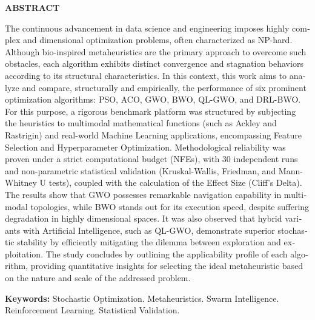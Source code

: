 \documentclass[12pt, a4paper, oneside]{report}
\begin{document}
\begin{center}
    \textbf{\Large ABSTRACT}
\end{center}
\vspace{1cm}
\begin{otherlanguage}{english}
The continuous advancement in data science and engineering imposes highly complex and dimensional optimization problems, often characterized as NP-hard. Although bio-inspired metaheuristics are the primary approach to overcome such obstacles, each algorithm exhibits distinct convergence and stagnation behaviors according to its structural characteristics. In this context, this work aims to analyze and compare, structurally and empirically, the performance of six prominent optimization algorithms: PSO, ACO, GWO, BWO, QL-GWO, and DRL-BWO. For this purpose, a rigorous benchmark platform was structured by subjecting the heuristics to multimodal mathematical functions (such as Ackley and Rastrigin) and real-world Machine Learning applications, encompassing Feature Selection and Hyperparameter Optimization. Methodological reliability was proven under a strict computational budget (NFEs), with 30 independent runs and non-parametric statistical validation (Kruskal-Wallis, Friedman, and Mann-Whitney U tests), coupled with the calculation of the Effect Size (Cliff's Delta). The results show that GWO possesses remarkable navigation capability in multimodal topologies, while BWO stands out for its execution speed, despite suffering degradation in highly dimensional spaces. It was also observed that hybrid variants with Artificial Intelligence, such as QL-GWO, demonstrate superior stochastic stability by efficiently mitigating the dilemma between exploration and exploitation. The study concludes by outlining the applicability profile of each algorithm, providing quantitative insights for selecting the ideal metaheuristic based on the nature and scale of the addressed problem.

\vspace{0.5cm}
\noindent \textbf{Keywords:} Stochastic Optimization. Metaheuristics. Swarm Intelligence. Reinforcement Learning. Statistical Validation.
\end{otherlanguage}
\clearpage
\end{document}
